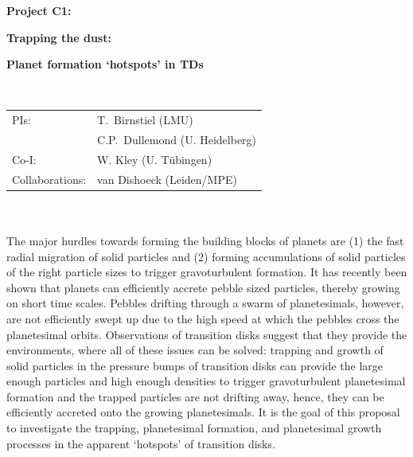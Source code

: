 \documentclass[10pt,fleqn,twoside]{article}
\newcommand{\Tcol}{\color{blue}}
\begin{document}
\newpage


\setcounter{page}{1}

\centerline{\huge\bf\Tcol
%
%
%
%
%
 Project C1:}
\vspace{1em}

\centerline{\LARGE\bf\Tcol Trapping the dust:}
\centerline{\LARGE\bf\Tcol  Planet formation `hotspots' in TDs}

%
%
%
%
%
\vskip1.0cm


\\
\begin{tabular}{ll}
{\textsf{PIs:}}            & T.~Birnstiel (LMU) \\
                           & C.P.~Dullemond (U. Heidelberg)\\
{\textsf{Co-I:}}           & W. Kley (U. Tübingen) \\
{\textsf{Collaborations:}} & van Dishoeck (Leiden/MPE) \\

\end{tabular}


\vspace{1em}
 \\

\vspace{1em}
\\
The major hurdles towards forming the building blocks of planets are
(1) the fast radial migration of solid particles and (2) forming
accumulations of solid particles of the right particle sizes to
trigger gravoturbulent formation. It has recently been shown that
planets can efficiently accrete pebble sized particles, thereby
growing on short time scales. Pebbles drifting through a swarm of
planetesimals, however, are not efficiently swept up due to the high
speed at which the pebbles cross the planetesimal orbits. Observations
of transition disks suggest that they provide the environments,
where all of these issues can be solved: trapping and growth of solid
particles in the pressure bumps of transition disks can provide
the large enough particles and high enough densities to trigger
gravoturbulent planetesimal formation and the trapped particles are
not drifting away, hence, they can be efficiently accreted onto the
growing planetesimals. It is the goal of this proposal to investigate
the trapping, planetesimal formation, and planetesimal growth
processes in the apparent `hotspots' of transition disks.
\end{document}

